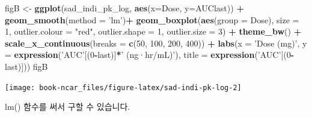 \documentclass[12pt,]{krantz}
\newenvironment{Shaded}{\begin{snugshade}}{\end{snugshade}}
\newcommand{\KeywordTok}[1]{\textcolor[rgb]{0.13,0.29,0.53}{\textbf{#1}}}
\newcommand{\DataTypeTok}[1]{\textcolor[rgb]{0.13,0.29,0.53}{#1}}
\newcommand{\DecValTok}[1]{\textcolor[rgb]{0.00,0.00,0.81}{#1}}
\newcommand{\StringTok}[1]{\textcolor[rgb]{0.31,0.60,0.02}{#1}}
\newcommand{\OperatorTok}[1]{\textcolor[rgb]{0.81,0.36,0.00}{\textbf{#1}}}
\newcommand{\NormalTok}[1]{#1}
\theoremstyle{definition}
\theoremstyle{definition}
\theoremstyle{definition}
\theoremstyle{remark}
\begin{document}
\begin{Shaded}
\begin{Highlighting}[]
\NormalTok{figB <-}\StringTok{ }\KeywordTok{ggplot}\NormalTok{(sad_indi_pk_log, }\KeywordTok{aes}\NormalTok{(}\DataTypeTok{x=}\NormalTok{Dose, }\DataTypeTok{y=}\NormalTok{AUClast)) }\OperatorTok{+}
\StringTok{  }\KeywordTok{geom_smooth}\NormalTok{(}\DataTypeTok{method =} \StringTok{'lm'}\NormalTok{)}\OperatorTok{+}
\StringTok{  }\KeywordTok{geom_boxplot}\NormalTok{(}\KeywordTok{aes}\NormalTok{(}\DataTypeTok{group =}\NormalTok{ Dose), }
               \DataTypeTok{size =} \DecValTok{1}\NormalTok{, }
               \DataTypeTok{outlier.colour =} \StringTok{"red"}\NormalTok{, }
               \DataTypeTok{outlier.shape =} \DecValTok{1}\NormalTok{, }
               \DataTypeTok{outlier.size =} \DecValTok{3}\NormalTok{) }\OperatorTok{+}
\StringTok{  }\KeywordTok{theme_bw}\NormalTok{() }\OperatorTok{+}
\StringTok{  }\KeywordTok{scale_x_continuous}\NormalTok{(}\DataTypeTok{breaks =} \KeywordTok{c}\NormalTok{(}\DecValTok{50}\NormalTok{, }\DecValTok{100}\NormalTok{, }\DecValTok{200}\NormalTok{, }\DecValTok{400}\NormalTok{)) }\OperatorTok{+}
\StringTok{  }\KeywordTok{labs}\NormalTok{(}\DataTypeTok{x =} \StringTok{'Dose (mg)'}\NormalTok{, }\DataTypeTok{y =} \KeywordTok{expression}\NormalTok{(}\StringTok{'AUC'}\NormalTok{[(}\DecValTok{0}\OperatorTok{-}\NormalTok{last)]}\OperatorTok{*}\StringTok{' (ng·hr/mL)'}\NormalTok{),}
       \DataTypeTok{title =} \KeywordTok{expression}\NormalTok{(}\StringTok{'AUC'}\NormalTok{[(}\DecValTok{0}\OperatorTok{-}\NormalTok{last)]))}
\NormalTok{figB}
\end{Highlighting}
\end{Shaded}

\texttt{[image: book-ncar\_files/figure-latex/sad-indi-pk-log-2]}

lm() 함수를 써서 구할 수 있습니다.
\end{document}

